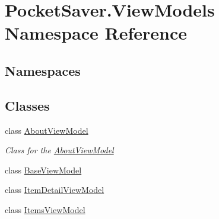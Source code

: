 \hypertarget{namespace_pocket_saver_1_1_view_models}{}\section{Pocket\+Saver.\+View\+Models Namespace Reference}
\label{namespace_pocket_saver_1_1_view_models}
\subsection*{Namespaces}
\begin{DoxyCompactItemize}
\end{DoxyCompactItemize}
\subsection*{Classes}
\begin{DoxyCompactItemize}
\item 
class \hyperlink{class_pocket_saver_1_1_view_models_1_1_about_view_model}{About\+View\+Model}
\begin{DoxyCompactList}\small\item\em Class for the \hyperlink{class_pocket_saver_1_1_view_models_1_1_about_view_model}{About\+View\+Model} \end{DoxyCompactList}\item 
class \hyperlink{class_pocket_saver_1_1_view_models_1_1_base_view_model}{Base\+View\+Model}
\item 
class \hyperlink{class_pocket_saver_1_1_view_models_1_1_item_detail_view_model}{Item\+Detail\+View\+Model}
\item 
class \hyperlink{class_pocket_saver_1_1_view_models_1_1_items_view_model}{Items\+View\+Model}
\end{DoxyCompactItemize}
